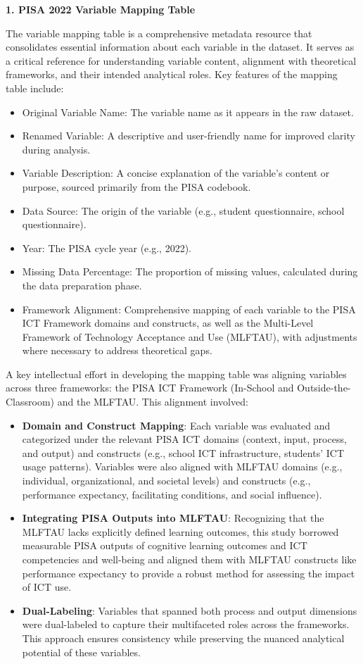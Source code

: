\documentclass[
]{article}
\begin{document}
\textbf{1. PISA 2022 Variable Mapping Table}

The variable mapping table is a comprehensive metadata resource that
consolidates essential information about each variable in the dataset.
It serves as a critical reference for understanding variable content,
alignment with theoretical frameworks, and their intended analytical
roles. Key features of the mapping table include:

\begin{itemize}
\item
  Original Variable Name: The variable name as it appears in the raw
  dataset.
\item
  Renamed Variable: A descriptive and user-friendly name for improved
  clarity during analysis.
\item
  Variable Description: A concise explanation of the variable's content
  or purpose, sourced primarily from the PISA codebook.
\item
  Data Source: The origin of the variable (e.g., student questionnaire,
  school questionnaire).
\item
  Year: The PISA cycle year (e.g., 2022).
\item
  Missing Data Percentage: The proportion of missing values, calculated
  during the data preparation phase.
\item
  Framework Alignment: Comprehensive mapping of each variable to the
  PISA ICT Framework domains and constructs, as well as the Multi-Level
  Framework of Technology Acceptance and Use (MLFTAU), with adjustments
  where necessary to address theoretical gaps.
\end{itemize}

A key intellectual effort in developing the mapping table was aligning
variables across three frameworks: the PISA ICT Framework (In-School and
Outside-the-Classroom) and the MLFTAU. This alignment involved:

\begin{itemize}
\item
  \textbf{Domain and Construct Mapping}: Each variable was evaluated and
  categorized under the relevant PISA ICT domains (context, input,
  process, and output) and constructs (e.g., school ICT infrastructure,
  students' ICT usage patterns). Variables were also aligned with MLFTAU
  domains (e.g., individual, organizational, and societal levels) and
  constructs (e.g., performance expectancy, facilitating conditions, and
  social influence).
\item
  \textbf{Integrating PISA Outputs into MLFTAU}: Recognizing that the
  MLFTAU lacks explicitly defined learning outcomes, this study borrowed
  measurable PISA outputs of cognitive learning outcomes and ICT
  competencies and well-being and aligned them with MLFTAU constructs
  like performance expectancy to provide a robust method for assessing
  the impact of ICT use.
\item
  \textbf{Dual-Labeling}: Variables that spanned both process and output
  dimensions were dual-labeled to capture their multifaceted roles
  across the frameworks. This approach ensures consistency while
  preserving the nuanced analytical potential of these variables.
\end{itemize}
\end{document}
